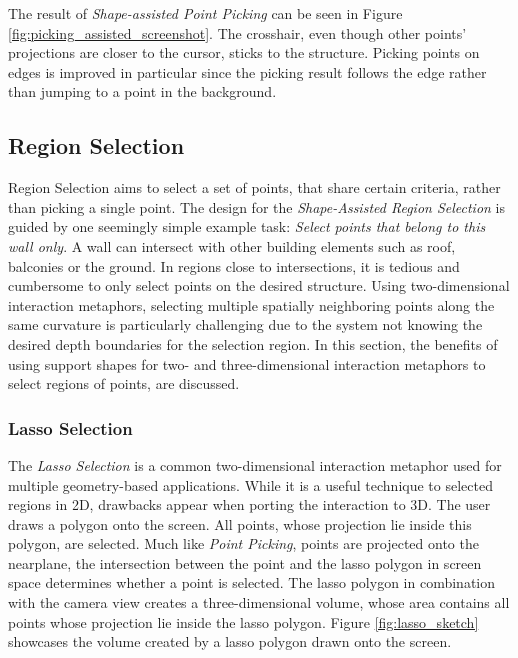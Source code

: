 The result of \textit{Shape-assisted Point Picking} can be seen in Figure \ref{fig:picking_assisted_screenshot}. The crosshair, even though other points' projections are closer to the cursor, sticks to the structure. Picking points on edges is improved in particular since the picking result follows the edge rather than jumping to a point in the background. 


\subsection{Region Selection}
\label{sec:regionSelection}

Region Selection aims to select a set of points, that share certain criteria, rather than picking a single point. 
The design for the \textit{Shape-Assisted Region Selection} is guided by one seemingly simple example task: \textit{Select points that belong to this wall only}. A wall can intersect with other building elements such as roof, balconies or the ground. In regions close to intersections, it is tedious and cumbersome to only select points on the desired structure. Using two-dimensional interaction metaphors, selecting multiple spatially neighboring points along the same curvature is particularly challenging due to the system not knowing the desired depth boundaries for the selection region. In this section, the benefits of using support shapes for two- and three-dimensional interaction metaphors to select regions of points,  are discussed. 


\subsubsection{Lasso Selection}

The \textit{Lasso Selection} is a common two-dimensional interaction metaphor used for multiple geometry-based applications. While it is a useful technique to selected regions in 2D, drawbacks appear when porting the interaction to 3D. The user draws a polygon onto the screen. All points, whose projection lie inside this polygon, are selected. Much like \textit{Point Picking}, points are projected onto the nearplane, the intersection between the point and the lasso polygon in screen space determines whether a point is selected. The lasso polygon in combination with the camera view creates a three-dimensional volume, whose area contains all points whose projection lie inside the lasso polygon. Figure \ref{fig:lasso_sketch} showcases the volume created by a lasso polygon drawn onto the screen.

